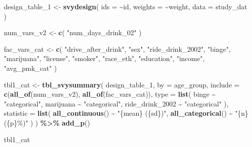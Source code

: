 \documentclass[
]{article}
\newenvironment{Shaded}{\begin{snugshade}}{\end{snugshade}}
\newcommand{\AttributeTok}[1]{\textcolor[rgb]{0.13,0.29,0.53}{#1}}
\newcommand{\FunctionTok}[1]{\textcolor[rgb]{0.13,0.29,0.53}{\textbf{#1}}}
\newcommand{\NormalTok}[1]{#1}
\newcommand{\OtherTok}[1]{\textcolor[rgb]{0.56,0.35,0.01}{#1}}
\newcommand{\SpecialCharTok}[1]{\textcolor[rgb]{0.81,0.36,0.00}{\textbf{#1}}}
\newcommand{\StringTok}[1]{\textcolor[rgb]{0.31,0.60,0.02}{#1}}
\begin{document}
\begin{Shaded}
\begin{Highlighting}[]
\NormalTok{design\_table\_1 }\OtherTok{\textless{}{-}} \FunctionTok{svydesign}\NormalTok{(}
  \AttributeTok{ids =} \SpecialCharTok{\textasciitilde{}}\NormalTok{id,}
  \AttributeTok{weights =} \SpecialCharTok{\textasciitilde{}}\NormalTok{weight,}
  \AttributeTok{data =}\NormalTok{ study\_dat}
\NormalTok{)}

\NormalTok{num\_vars\_v2 }\OtherTok{\textless{}{-}} \FunctionTok{c}\NormalTok{(}
  \StringTok{"num\_days\_drink\_02"}
\NormalTok{)}

\NormalTok{fac\_vars\_cat }\OtherTok{\textless{}{-}} \FunctionTok{c}\NormalTok{(}
  \StringTok{"drive\_after\_drink"}\NormalTok{, }\StringTok{"sex"}\NormalTok{,}
  \StringTok{"ride\_drink\_2002"}\NormalTok{, }\StringTok{"binge"}\NormalTok{, }\StringTok{"marijuana"}\NormalTok{,}
  \StringTok{"license"}\NormalTok{, }\StringTok{"smoker"}\NormalTok{, }\StringTok{"race\_eth"}\NormalTok{, }\StringTok{"education"}\NormalTok{, }\StringTok{"income"}\NormalTok{,}
  \StringTok{"avg\_pmk\_cat"}
\NormalTok{) }

\NormalTok{tbl1\_cat }\OtherTok{\textless{}{-}} \FunctionTok{tbl\_svysummary}\NormalTok{(}
\NormalTok{  design\_table\_1,}
  \AttributeTok{by =}\NormalTok{ age\_group,}
  \AttributeTok{include =} \FunctionTok{c}\NormalTok{(}\FunctionTok{all\_of}\NormalTok{(num\_vars\_v2), }\FunctionTok{all\_of}\NormalTok{(fac\_vars\_cat)),}
  \AttributeTok{type =} \FunctionTok{list}\NormalTok{(}
\NormalTok{    binge }\SpecialCharTok{\textasciitilde{}} \StringTok{"categorical"}\NormalTok{,}
\NormalTok{    marijuana }\SpecialCharTok{\textasciitilde{}} \StringTok{"categorical"}\NormalTok{,}
\NormalTok{    ride\_drink\_2002 }\SpecialCharTok{\textasciitilde{}} \StringTok{"categorical"}
\NormalTok{  ),}
  \AttributeTok{statistic =} \FunctionTok{list}\NormalTok{(}
    \FunctionTok{all\_continuous}\NormalTok{() }\SpecialCharTok{\textasciitilde{}} \StringTok{"\{mean\} (\{sd\})"}\NormalTok{,}
    \FunctionTok{all\_categorical}\NormalTok{() }\SpecialCharTok{\textasciitilde{}} \StringTok{"\{n\} (\{p\}\%)"}
\NormalTok{  )}
\NormalTok{) }\SpecialCharTok{\%\textgreater{}\%}
  \FunctionTok{add\_p}\NormalTok{() }

\NormalTok{tbl1\_cat}
\end{Highlighting}
\end{Shaded}
\end{document}
